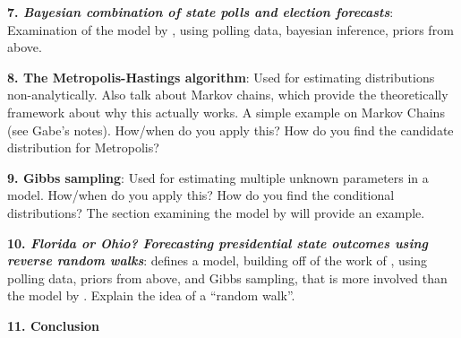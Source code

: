 \documentclass[12pt]{article}
\begin{document}
\textbf{7. \emph{Bayesian combination of state polls and election forecasts}}: Examination of the model by \cite{Lock:2010aa}, using polling data, bayesian inference, priors from above.

\textbf{8. The Metropolis-Hastings algorithm}: Used for estimating distributions non-analytically. Also talk about Markov chains, which provide the theoretically framework about why this actually works. A simple example on Markov Chains (see Gabe's notes). How/when do you apply this? How do you find the candidate distribution for Metropolis?

\textbf{9. Gibbs sampling}: Used for estimating multiple unknown parameters in a model. How/when do you apply this? How do you find the conditional distributions? The section examining the model by \cite{Strauss:2007aa} will provide an example.

\textbf{10. \emph{{Florida} or {Ohio}? {F}orecasting presidential state outcomes using reverse random walks}}: \cite{Strauss:2007aa} defines a model, building off of the work of \cite{Jackman:2005aa}, using polling data, priors from above, and Gibbs sampling, that is more involved than the model by \cite{Lock:2010aa}. Explain the idea of a ``random walk''.

\textbf{11. Conclusion}


\end{document}

